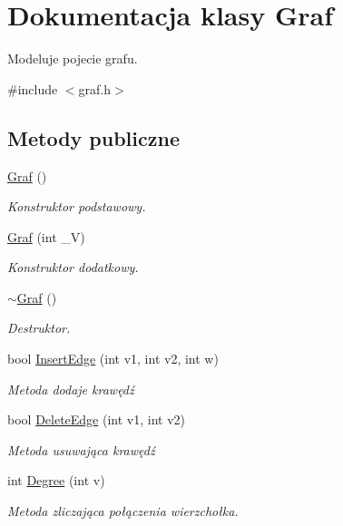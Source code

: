 \hypertarget{class_graf}{\section{\-Dokumentacja klasy \-Graf}
\label{class_graf}
}


\-Modeluje pojecie grafu.  




{\ttfamily \#include $<$graf.\-h$>$}

\subsection*{\-Metody publiczne}
\begin{DoxyCompactItemize}
\item 
\hyperlink{class_graf_a05a504069321858769df57555045d808}{\-Graf} ()
\begin{DoxyCompactList}\small\item\em \-Konstruktor podstawowy. \end{DoxyCompactList}\item 
\hyperlink{class_graf_a5e4550718d37557ac0f5a49b4fe286da}{\-Graf} (int \-\_\-\-V)
\begin{DoxyCompactList}\small\item\em \-Konstruktor dodatkowy. \end{DoxyCompactList}\item 
\hyperlink{class_graf_a4ff3904fd04f367ac0219b52719c567e}{$\sim$\-Graf} ()
\begin{DoxyCompactList}\small\item\em \-Destruktor. \end{DoxyCompactList}\item 
bool \hyperlink{class_graf_a230530c155c0a48d97081e4d6802b8f1}{\-Insert\-Edge} (int v1, int v2, int w)
\begin{DoxyCompactList}\small\item\em \-Metoda dodaje krawędź \end{DoxyCompactList}\item 
bool \hyperlink{class_graf_ae0639ee8216317ffb4144daadfb28e8b}{\-Delete\-Edge} (int v1, int v2)
\begin{DoxyCompactList}\small\item\em \-Metoda usuwająca krawędź \end{DoxyCompactList}\item 
int \hyperlink{class_graf_a687f7efa69596993dd1c37b36d5db0fd}{\-Degree} (int v)
\begin{DoxyCompactList}\small\item\em \-Metoda zliczająca połączenia wierzchołka. \end{DoxyCompactList}\item 

\end{DoxyCompactItemize}
